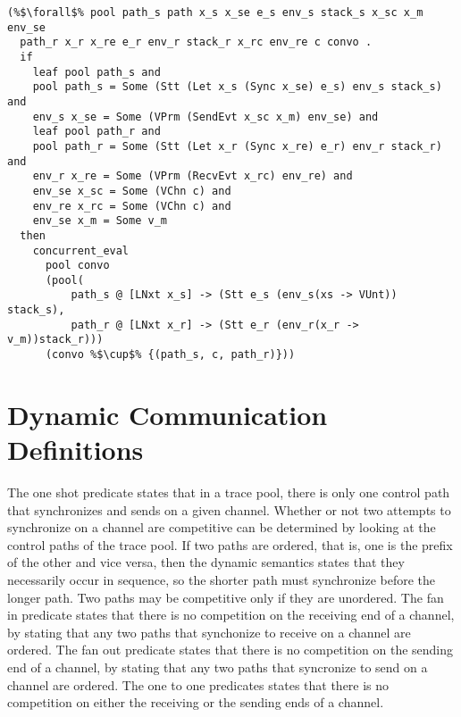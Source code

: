 \documentclass{article}
\begin{document}
\begin{lstlisting}[language=logic, style=codestyle1, escapechar=\%]
(%$\forall$% pool path_s path x_s x_se e_s env_s stack_s x_sc x_m env_se
  path_r x_r x_re e_r env_r stack_r x_rc env_re c convo .
  if 
    leaf pool path_s and
    pool path_s = Some (Stt (Let x_s (Sync x_se) e_s) env_s stack_s) and
    env_s x_se = Some (VPrm (SendEvt x_sc x_m) env_se) and
    leaf pool path_r and
    pool path_r = Some (Stt (Let x_r (Sync x_re) e_r) env_r stack_r) and
    env_r x_re = Some (VPrm (RecvEvt x_rc) env_re) and
    env_se x_sc = Some (VChn c) and
    env_re x_rc = Some (VChn c) and 
    env_se x_m = Some v_m
  then
    concurrent_eval
      pool convo
      (pool(
          path_s @ [LNxt x_s] -> (Stt e_s (env_s(xs -> VUnt)) stack_s), 
          path_r @ [LNxt x_r] -> (Stt e_r (env_r(x_r -> v_m))stack_r))) 
      (convo %$\cup$% {(path_s, c, path_r)}))

\end{lstlisting}

\section{Dynamic Communication Definitions}

The one shot predicate states that in a trace pool, there is only one control path that
synchronizes and sends on a given channel. Whether or not two attempts to synchronize on a
channel are competitive can be determined by
looking at the control paths of the trace pool. If two paths are ordered, that is, one is the
prefix of the other and vice versa, then the dynamic semantics states that they necessarily
occur in sequence, so the shorter path must synchronize before the longer path. Two paths may
be competitive only if they are unordered. The fan in predicate states that there is no
competition on the receiving end of a channel, by stating that any two paths that synchonize to
receive on a channel are ordered. The fan out predicate states that there is no competition on
the sending end of a channel, by stating that any two paths that syncronize to send on a
channel are ordered. The one to one predicates states that there is no competition on either
the receiving or the sending ends of a channel. 
\end{document}
